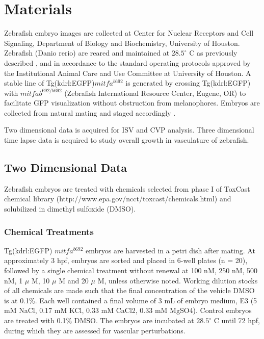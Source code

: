\chapter{Materials}\label{chap:materials}


Zebrafish embryo images are collected at Center for Nuclear Receptors and Cell Signaling, Department of Biology and Biochemistry, University of Houston. Zebrafish (Danio rerio) are reared and maintained at $28.5^{\circ}$ C as previously described \cite{westerfield00}, and in accordance to the standard operating protocols approved by the Institutional Animal Care and Use Committee at University of Houston. A stable line of Tg(kdrl:EGFP)$mitfa^{b692}$ is generated by crossing Tg(kdrl:EGFP) with $mitfab^{692/b692}$ (Zebrafish International Resource Center, Eugene, OR) to facilitate GFP visualization without obstruction from melanophores. Embryos are collected from natural mating and staged accordingly \cite{Kimmel95}.

Two dimensional data is acquired for ISV and CVP analysis. Three dimensional time lapse data is acquired to study overall growth in vasculature of zebrafish. 

\section{Two Dimensional Data}
Zebrafish embryos are treated with chemicals selected from phase I of ToxCast chemical library (http://www.epa.gov/ncct/toxcast/chemicals.html) and solubilized in dimethyl sulfoxide (DMSO).

\subsection{Chemical Treatments}
Tg(kdrl:EGFP) $mitfa^{b692}$ embryos are harvested in a petri dish after mating. At approximately 3 hpf, embryos are sorted and placed in 6-well plates (n = 20), followed by a single chemical treatment without renewal at 100 nM, 250 nM, 500 nM, 1 $\mu$ M, 10 $\mu$ M and 20 $\mu$ M, unless otherwise noted. Working dilution stocks of all chemicals are made such that the final concentration of the vehicle DMSO is at 0.1\%. Each well contained a final volume of 3 mL of embryo medium, E3 (5 mM NaCl, 0.17 mM KCl, 0.33 mM CaCl2, 0.33 mM MgSO4). Control embryos are treated with 0.1\% DMSO. The embryos are incubated at $28.5^{\circ}$ C until 72 hpf, during which they are assessed for vascular perturbations. 

